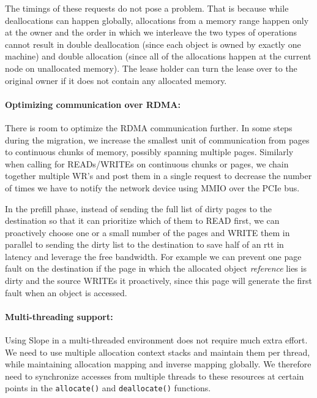 The timings of these requests do not pose a problem. That is
because while deallocations can happen globally, allocations from a memory range
happen only at the owner and the order in which we interleave the two types of
operations cannot result in double deallocation (since each object is owned by
exactly one machine) and double allocation (since all of the allocations happen
at the current node on unallocated memory). The lease holder can turn the lease
over to the original owner if it does not contain any allocated memory.

\paragraph{Optimizing communication over RDMA:} There is room to optimize
the RDMA communication further. In some steps during the migration, we
increase the smallest unit of communication from pages to continuous chunks
of memory, possibly spanning multiple pages. Similarly when calling for
READs/WRITEs on continuous chunks or pages, we chain together multiple
WR's and post them in a single request to decrease the number of times we
have to notify the network device using MMIO over the PCIe bus.

In the prefill phase, instead of sending the full list of dirty pages to the
destination so that it can prioritize which of them to READ first, we can
proactively choose one or a small number of the pages and WRITE them in
parallel to sending the dirty list to the destination to save half of an rtt
in latency and leverage the free bandwidth.
For example we can prevent one page fault on the destination
if the page in which the allocated object \emph{reference} lies is dirty and
the source WRITEs it proactively, since this page will generate the first
fault when an object is accessed.


\paragraph{Multi-threading support:} Using Slope in a multi-threaded
environment does not require much extra effort. We need to use multiple
allocation context stacks and maintain them per thread, while maintaining
allocation mapping and inverse mapping globally. We therefore need to
synchronize accesses from multiple threads to these resources at certain points
in the \texttt{allocate()} and \texttt{deallocate()} functions.
